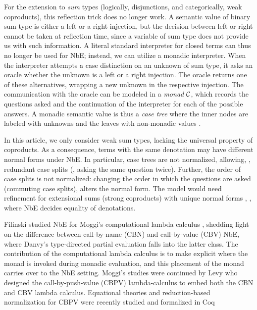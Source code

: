 \documentclass[sigconf,screen,fleqn]{acmart} %
\begin{document}
For the extension to \emph{sum} types (logically, disjunctions, and categorically,
weak coproducts), this reflection trick does no longer work.  A
semantic value of binary sum type is either a left or a right
injection, but the decision between left or right cannot be taken at
reflection time, since a variable of sum type does not provide us with
such information.  A literal standard interpreter for closed terms can
thus no longer be used for NbE;  instead, we can utilize a monadic
interpreter.  When the interpreter attempts a case distinction on an
unknown of sum type, it asks an oracle whether the unknown is a left
or a right injection.  The oracle returns one of these alternatives,
wrapping a new unknown in the respective injection.  The communication with the
oracle can be modeled in a \emph{monad} $\mathcal{C}$,
which records the questions asked and the continuation of the
interpreter for each of the possible answers.
A monadic semantic value is thus a \emph{case tree} where the inner
nodes are labeled with unknowns and the leaves
with non-monadic values \cite{altenkirchUustalu:flops04}.

In this article, we only consider weak sum types, lacking the universal
property of coproducts.  As a consequence, terms with the same
denotation may have different normal forms under NbE.
In particular, case trees are not normalized, allowing,
\eg, redundant case splits (\ie, asking the same question twice).
Further, the order of case splits is not normalized: changing the
order in which the questions are asked (commuting case splits),
alters the normal form.
The model would need refinement for extensional sums (strong
coproducts) with unique normal forms
\cite{altenkirchDybjerHofmannScott:lics01,altenkirchUustalu:flops04,balatDiCosmoFiore:popl04,barral:PhD,scherer:popl17},
\ie, where NbE decides equality of denotations.

Filinski \cite{filinski:tlca01} studied NbE for Moggi's computational lambda
calculus \cite{moggi:infcomp91}, shedding light on the difference
between call-by-name (CBN) and call-by-value (CBV) NbE, where Danvy's
type-directed partial evaluation \cite{danvy:popl96} falls into the
latter class.  The contribution of the computational lambda calculus
is to make explicit where the monad is invoked during monadic
evaluation, and this placement of the monad carries over to the NbE
setting.  Moggi's studies were continued by Levy \cite{levy:hosc06}
who designed the call-by-push-value (CBPV) lambda-calculus to embed
both the CBN and CBV lambda calculus.  Equational theories and
reduction-based normalization for CBPV were recently studied and
formalized in Coq~\cite{rizkallahGarbuzovZdancewic:itp18,forsterSchaeferSpiesStark:cpp19}
\end{document}

